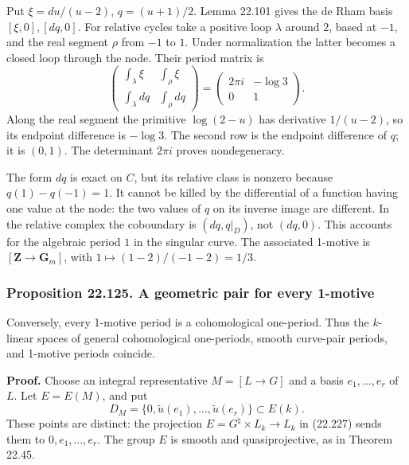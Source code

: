 \documentclass[
  11pt,
  a4paper,
]{article}
\begin{document}
Put \(\xi=du/(u-2)\), \(q=(u+1)/2\). Lemma 22.101 gives the de Rham
basis \([\xi,0],[dq,0]\). For relative cycles take a positive loop
\(\lambda\) around \(2\), based at \(-1\), and the real segment \(\rho\)
from \(-1\) to \(1\). Under normalization the latter becomes a closed
loop through the node. Their period matrix is \[
 \begin{pmatrix}
   \displaystyle\int_\lambda\xi&
        \displaystyle\int_\rho\xi\\
   \displaystyle\int_\lambda dq&
        \displaystyle\int_\rho dq
 \end{pmatrix}
 =
 \begin{pmatrix}2\pi i&-\log3\\0&1\end{pmatrix}.
 \tag{22.323}
\] Along the real segment the primitive \(\log(2-u)\) has derivative
\(1/(u-2)\), so its endpoint difference is \(-\log3\). The second row is
the endpoint difference of \(q\); it is \((0,1)\). The determinant
\(2\pi i\) proves nondegeneracy.

The form \(dq\) is exact on \(C\), but its relative class is nonzero
because \(q(1)-q(-1)=1\). It cannot be killed by the differential of a
function having one value at the node: the two values of \(q\) on its
inverse image are different. In the relative complex the coboundary is
\((dq,q|_D)\), not \((dq,0)\). This accounts for the algebraic period
\(1\) in the singular curve. The associated 1-motive is
\([\mathbf Z\to\mathbf G_m]\), with \(1\mapsto(1-2)/(-1-2)=1/3\).

\subsubsection{Proposition 22.125. A geometric pair for every
1-motive}\label{proposition-22.125.-a-geometric-pair-for-every-1-motive}

Conversely, every 1-motive period is a cohomological one-period. Thus
the \(k\)-linear spaces of general cohomological one-periods, smooth
curve-pair periods, and 1-motive periods coincide.

\textbf{Proof.} Choose an integral representative \(M=[L\to G]\) and a
basis \(e_1,\ldots,e_r\) of \(L\). Let \(E=E(M)\), and put \[
 D_M=\{0,\widetilde u(e_1),\ldots,\widetilde u(e_r)\}
          \subset E(k).
 \tag{22.324}
\] These points are distinct: the projection
\(E=G^\natural\times L_k\to L_k\) in (22.227) sends them to
\(0,e_1,\ldots,e_r\). The group \(E\) is smooth and quasiprojective, as
in Theorem 22.45.
\end{document}
